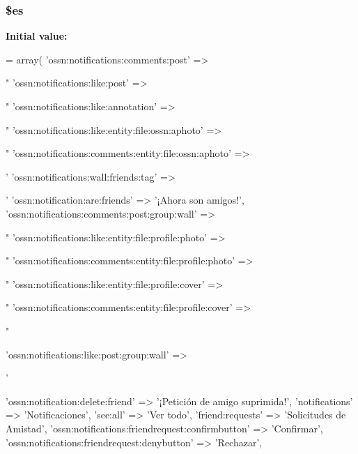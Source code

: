 \subsubsection[{\texorpdfstring{\$es}{$es}}]{\setlength{\rightskip}{0pt plus 5cm}\$es}\hypertarget{components_2_ossn_notifications_2locale_2ossn_8es_8php_a388cbda27103d2baee3997798d1f2744}{}\label{components_2_ossn_notifications_2locale_2ossn_8es_8php_a388cbda27103d2baee3997798d1f2744}
{\bfseries Initial value\+:}
\begin{DoxyCode}
= array(
    \textcolor{stringliteral}{'ossn:notifications:comments:post'} => \textcolor{stringliteral}{"%
    \textcolor{stringliteral}{'ossn:notifications:like:post'} => \textcolor{stringliteral}{"%
    \textcolor{stringliteral}{'ossn:notifications:like:annotation'} => \textcolor{stringliteral}{"%
    \textcolor{stringliteral}{'ossn:notifications:like:entity:file:ossn:aphoto'} => \textcolor{stringliteral}{"%
    \textcolor{stringliteral}{'ossn:notifications:comments:entity:file:ossn:aphoto'} => \textcolor{stringliteral}{'%
    \textcolor{stringliteral}{'ossn:notifications:wall:friends:tag'} => \textcolor{stringliteral}{'%
    \textcolor{stringliteral}{'ossn:notification:are:friends'} => \textcolor{stringliteral}{'¡Ahora son amigos!'},
    \textcolor{stringliteral}{'ossn:notifications:comments:post:group:wall'} => \textcolor{stringliteral}{"%
    \textcolor{stringliteral}{'ossn:notifications:like:entity:file:profile:photo'} => \textcolor{stringliteral}{"%
    \textcolor{stringliteral}{'ossn:notifications:comments:entity:file:profile:photo'} => \textcolor{stringliteral}{"%
    \textcolor{stringliteral}{'ossn:notifications:like:entity:file:profile:cover'} => \textcolor{stringliteral}{"%
    \textcolor{stringliteral}{'ossn:notifications:comments:entity:file:profile:cover'} => \textcolor{stringliteral}{"%

    \textcolor{stringliteral}{'ossn:notifications:like:post:group:wall'} => \textcolor{stringliteral}{'%
    
    \textcolor{stringliteral}{'ossn:notification:delete:friend'} => \textcolor{stringliteral}{'¡Petición de amigo suprimida!'},
    \textcolor{stringliteral}{'notifications'} => \textcolor{stringliteral}{'Notificaciones'},
    \textcolor{stringliteral}{'see:all'} => \textcolor{stringliteral}{'Ver todo'},
    \textcolor{stringliteral}{'friend:requests'} => \textcolor{stringliteral}{'Solicitudes de Amistad'},
    \textcolor{stringliteral}{'ossn:notifications:friendrequest:confirmbutton'} => \textcolor{stringliteral}{'Confirmar'},
    \textcolor{stringliteral}{'ossn:notifications:friendrequest:denybutton'} => \textcolor{stringliteral}{'Rechazar'},
    
}}}}}}}}}}}}
\end{DoxyCode}
